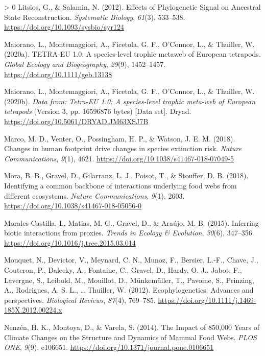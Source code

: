 \documentclass[11pt]{article}
\newlength{\cslhangindent}
\newenvironment{CSLReferences}[3] %
 {%
  \setlength{\parindent}{0pt}
  \ifodd #1 \everypar{\setlength{\hangindent}{\cslhangindent}}\ignorespaces\fi
  \ifnum #2 > 0
  \setlength{\parskip}{#2\baselineskip}
  \fi
 }%
 {}
\begin{document}
\begin{CSLReferences}{1}{0}
\leavevmode\hypertarget{ref-Litsios2012EffPhy}{}%
Litsios, G., \& Salamin, N. (2012). Effects of Phylogenetic Signal on
Ancestral State Reconstruction. \emph{Systematic Biology}, \emph{61}(3),
533--538. \url{https://doi.org/10.1093/sysbio/syr124}

\leavevmode\hypertarget{ref-Maiorano2020Tet10}{}%
Maiorano, L., Montemaggiori, A., Ficetola, G. F., O'Connor, L., \&
Thuiller, W. (2020a). TETRA-EU 1.0: A species-level trophic metaweb of
European tetrapods. \emph{Global Ecology and Biogeography},
\emph{29}(9), 1452--1457. \url{https://doi.org/10.1111/geb.13138}

\leavevmode\hypertarget{ref-Maiorano2020DatTet}{}%
Maiorano, L., Montemaggiori, A., Ficetola, G. F., O'Connor, L., \&
Thuiller, W. (2020b). \emph{Data from: Tetra-EU 1.0: A species-level
trophic meta-web of European tetrapods} (Version 3, pp. 16596876 bytes)
{[}Data set{]}. Dryad. \url{https://doi.org/10.5061/DRYAD.JM63XSJ7B}

\leavevmode\hypertarget{ref-Marco2018ChaHum}{}%
Marco, M. D., Venter, O., Possingham, H. P., \& Watson, J. E. M. (2018).
Changes in human footprint drive changes in species extinction risk.
\emph{Nature Communications}, \emph{9}(1), 4621.
\url{https://doi.org/10.1038/s41467-018-07049-5}

\leavevmode\hypertarget{ref-Mora2018IdeCom}{}%
Mora, B. B., Gravel, D., Gilarranz, L. J., Poisot, T., \& Stouffer, D.
B. (2018). Identifying a common backbone of interactions underlying food
webs from different ecosystems. \emph{Nature Communications},
\emph{9}(1), 2603. \url{https://doi.org/10.1038/s41467-018-05056-0}

\leavevmode\hypertarget{ref-Morales-Castilla2015InfBio}{}%
Morales-Castilla, I., Matias, M. G., Gravel, D., \& Araújo, M. B.
(2015). Inferring biotic interactions from proxies. \emph{Trends in
Ecology \& Evolution}, \emph{30}(6), 347--356.
\url{https://doi.org/10.1016/j.tree.2015.03.014}

\leavevmode\hypertarget{ref-Mouquet2012EcoAdv}{}%
Mouquet, N., Devictor, V., Meynard, C. N., Munoz, F., Bersier, L.-F.,
Chave, J., Couteron, P., Dalecky, A., Fontaine, C., Gravel, D., Hardy,
O. J., Jabot, F., Lavergne, S., Leibold, M., Mouillot, D., Münkemüller,
T., Pavoine, S., Prinzing, A., Rodrigues, A. S. L., \ldots{} Thuiller,
W. (2012). Ecophylogenetics: Advances and perspectives. \emph{Biological
Reviews}, \emph{87}(4), 769--785.
\url{https://doi.org/10.1111/j.1469-185X.2012.00224.x}

\leavevmode\hypertarget{ref-Nenzen2014Imp850}{}%
Nenzén, H. K., Montoya, D., \& Varela, S. (2014). The Impact of 850,000
Years of Climate Changes on the Structure and Dynamics of Mammal Food
Webs. \emph{PLOS ONE}, \emph{9}(9), e106651.
\url{https://doi.org/10.1371/journal.pone.0106651}


\end{CSLReferences}
\end{document}
